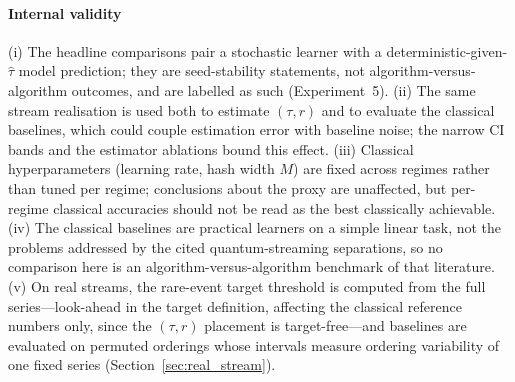 \documentclass[sensors,article,submit,pdftex,moreauthors]{Definitions/mdpi}
\providecommand{\DIFadd}[1]{{\protect\color{blue}#1}} %
\providecommand{\DIFdel}[1]{} %
\providecommand{\DIFaddbegin}{} %
\providecommand{\DIFaddend}{} %
\providecommand{\DIFdelbegin}{} %
\providecommand{\DIFdelend}{} %
\begin{document}
\paragraph{\DIFadd{Internal validity}} \DIFadd{(i) The headline comparisons pair a stochastic learner with a deterministic-given-$\hat{\tau}$ model prediction; they are seed-stability statements, not algorithm-versus-algorithm outcomes, and are labelled as such (Experiment~5). (ii) The same stream realisation is used both to estimate $(\tau, r)$ and to evaluate the classical baselines, which could couple estimation error with baseline noise; the narrow CI bands and the estimator ablations bound this effect. (iii) Classical hyperparameters (learning rate, hash width $M$) are fixed across regimes rather than tuned per regime; conclusions about the proxy are unaffected, but per-regime classical accuracies should not be read as the best classically achievable. (iv) The classical baselines are practical }\DIFaddend learners on a simple linear \DIFdelbegin \DIFdel{classification task; they are not the worst-case task-specific instances that motivate the $\Omega(\sqrt{N})$ classical hardness reference, so the empirical comparison is not }\DIFdelend \DIFaddbegin \DIFadd{task, not the problems addressed by the cited quantum-streaming separations, so no comparison here is }\DIFaddend an algorithm-versus-algorithm benchmark \DIFdelbegin \DIFdel{.
    }%
\textbf{\DIFdel{Real-stream evidence is a sanity check, not a domain-wide validation.}} %
\DIFdel{Two NAB datasets are examined }\DIFdelend \DIFaddbegin \DIFadd{of that literature. (v) On real streams, the rare-event target threshold is computed from the full series---look-ahead in the target definition, affecting the classical reference numbers only, since the $(\tau, r)$ placement is target-free---and baselines are evaluated on permuted orderings whose intervals measure ordering variability of one fixed series }\DIFaddend (Section~\ref{sec:real_stream})\DIFdelbegin \DIFdel{; broader }\DIFdelend \DIFaddbegin \DIFadd{.
}
\end{document}
